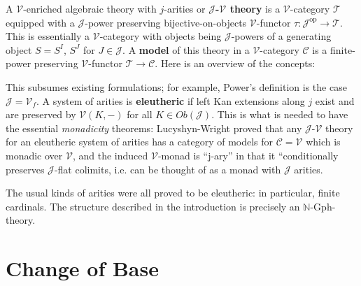 \documentclass[a4paper,UKenglish]{article}
\theoremstyle{definition}
\newcommand{\Gph}{\mathrm{Gph}}
\newcommand{\op}{\mathrm{op}}
\newcommand{\NN}{\mathbb{N}}
\newcommand{\V}{\mathscr{V}}
\newcommand{\C}{\mathscr{C}}
\newcommand{\T}{\mathscr{T}}
\newcommand{\J}{\mathscr{J}}
\begin{document}
A $\V$-enriched algebraic theory with $j$-arities or \textbf{$\J$-$\V$ theory} is a $\V$-category $\T$ equipped with a $\J$-power preserving bijective-on-objects $\V$-functor $\tau:\J^\op \to \T$. This is essentially a $\V$-category with objects being $\J$-powers of a generating object $S = S^I$, $S^J$ for $J \in \J$. A \textbf{model} of this theory in a $\V$-category $\C$ is a finite-power preserving $\V$-functor $\T \to \C$. Here is an overview of the concepts: 

\begin{center}
\end{center}

This subsumes existing formulations; for example, Power's definition is the case $\J = \V_f$. A system of arities is \textbf{eleutheric} if left Kan extensions along $j$ exist and are preserved by $\V(K,-)$ for all $K \in Ob(\J)$. This is what is needed to have the essential \textit{monadicity} theorems: Lucyshyn-Wright proved that any $\J$-$\V$ theory for an eleutheric system of arities has a category of models for $\C = \V$ which is monadic over $\V$, and the induced $\V$-monad is ``j-ary'' in that it ``conditionally preserves $\J$-flat colimits, i.e. can be thought of as a monad with $\J$ arities.

The usual kinds of arities were all proved to be eleutheric: in particular, finite cardinals. The structure described in the introduction is precisely an $\NN$-$\Gph$-theory.

\section{Change of Base}
\end{document}
